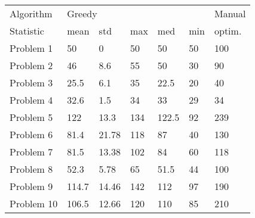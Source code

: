 \begin{tabular}{lllllll}
\toprule
Algorithm & \multicolumn{5}{l}{Greedy} & Manual \\
Statistic &   mean &    std &  max &    med & min & optim. \\
\midrule
Problem 1  &     50 &      0 &   50 &     50 &  50 &    100 \\
Problem 2  &     46 &    8.6 &   55 &     50 &  30 &     90 \\
Problem 3  &   25.5 &    6.1 &   35 &   22.5 &  20 &     40 \\
Problem 4  &   32.6 &    1.5 &   34 &     33 &  29 &     34 \\
Problem 5  &    122 &   13.3 &  134 &  122.5 &  92 &    239 \\
Problem 6  &   81.4 &  21.78 &  118 &     87 &  40 &    130 \\
Problem 7  &   81.5 &  13.38 &  102 &     84 &  60 &    118 \\
Problem 8  &   52.3 &   5.78 &   65 &   51.5 &  44 &    100 \\
Problem 9  &  114.7 &  14.46 &  142 &    112 &  97 &    190 \\
Problem 10 &  106.5 &  12.66 &  120 &    110 &  85 &    210 \\
\bottomrule
\end{tabular}
